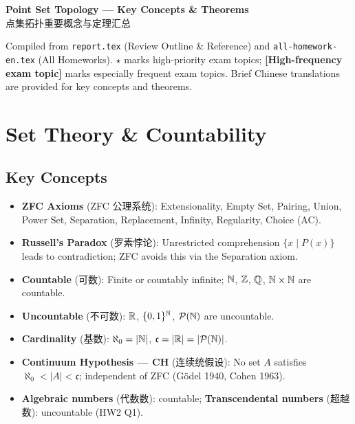 \documentclass{article}
\newcommand{\starKey}{\textcolor{red!65!black}{\textbf{$\star$}}}
\newcommand{\examKey}{\textcolor{red!65!black}{\textbf{[High-frequency exam topic]}}}
\begin{document}
\pagestyle{fancy}
\fancyhead{}
\rhead{\today}

\begin{center}
  {\Large\bfseries Point Set Topology --- Key Concepts \& Theorems}\\[6pt]
  {\large 点集拓扑重要概念与定理汇总}
\end{center}
\vspace{6pt}

\noindent Compiled from \texttt{report.tex} (Review Outline \& Reference) and
\texttt{all-homework-en.tex} (All Homeworks).
\starKey{} marks high-priority exam topics; \examKey{} marks especially frequent exam topics.
Brief Chinese translations are provided for key concepts and theorems.

\tableofcontents
\newpage

\section{Set Theory \& Countability}

\subsection{Key Concepts}

\begin{itemize}
  \item \textbf{ZFC Axioms} (ZFC 公理系统): Extensionality, Empty Set, Pairing,
  Union, Power Set, Separation, Replacement, Infinity, Regularity, Choice (AC).
  \item \textbf{Russell's Paradox} (罗素悖论): Unrestricted comprehension
  $\{x\mid P(x)\}$ leads to contradiction; ZFC avoids this via the Separation axiom.
  \item \textbf{Countable} (可数): Finite or countably infinite;
  $\mathbb{N}$, $\mathbb{Z}$, $\mathbb{Q}$, $\mathbb{N}\times\mathbb{N}$ are countable.
  \item \textbf{Uncountable} (不可数): $\mathbb{R}$, $\{0,1\}^{\mathbb{N}}$, $\mathcal{P}(\mathbb{N})$ are uncountable.
  \item \textbf{Cardinality} (基数): $\aleph_0=|\mathbb{N}|$, $\mathfrak{c}=|\mathbb{R}|=|\mathcal{P}(\mathbb{N})|$.
  \item \textbf{Continuum Hypothesis --- CH} (连续统假设): No set $A$ satisfies
  $\aleph_0<|A|<\mathfrak{c}$; independent of ZFC (G\"odel 1940, Cohen 1963).
  \item \textbf{Algebraic numbers} (代数数): countable;
  \textbf{Transcendental numbers} (超越数): uncountable (HW2 Q1).
\end{itemize}
\end{document}

